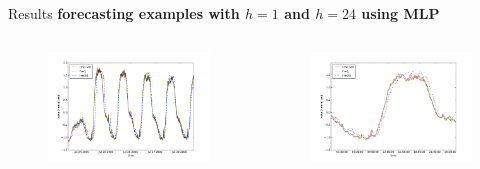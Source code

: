 \documentclass{beamer}
\begin{document}
  \begin{frame}{Results}
    \textbf{forecasting examples with \(h=1\) and \(h=24\) using MLP}
    
    \begin{columns}[c]
      \begin{figure}
       \includegraphics[width=1.1\textwidth]{images/example_forecast.pdf}
      \end{figure}

       \begin{figure}
        \includegraphics[width=1.1\textwidth]{images/example_forecast_day.pdf}
       \end{figure}
    \end{columns}
  \end{frame}
  
\end{document}
